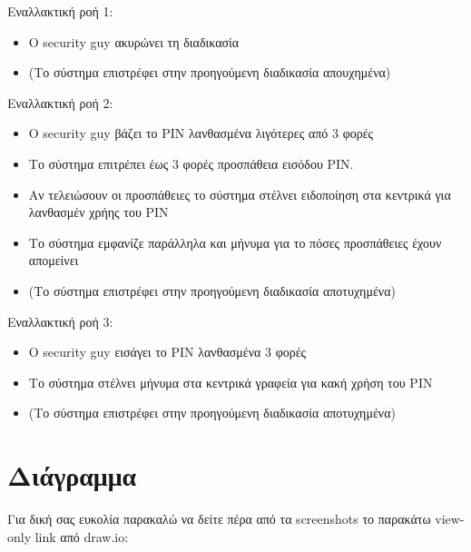 \documentclass{article}
\begin{document}
\noindent Εναλλακτική ροή 1:
\begin{itemize}
    \item Ο security guy ακυρώνει τη διαδικασία
    \item (Το σύστημα επιστρέφει στην προηγούμενη διαδικασία απουχημένα)
\end{itemize}

\noindent Εναλλακτική ροή 2:
\begin{itemize}
    \item Ο security guy βάζει το PIN λανθασμένα λιγότερες από 3 φορές
    \item Το σύστημα επιτρέπει έως 3 φορές προσπάθεια εισόδου PIN.
    \item Αν τελειώσουν οι προσπάθειες το σύστημα στέλνει ειδοποίηση στα κεντρικά για λανθασμέν χρήης του PIN
    \item Το σύστημα εμφανίζε παράλληλα και μήνυμα για το πόσες προσπάθειες έχουν απομείνει
    \item (Το σύστημα επιστρέφει στην προηγούμενη διαδικασία αποτυχημένα)
\end{itemize}

\noindent Εναλλακτική ροή 3:
\begin{itemize}
    \item Ο security guy εισάγει το PIN λανθασμένα 3 φορές
    \item Το σύστημα στέλνει μήνυμα στα κεντρικά γραφεία για κακή χρήση του PIN
    \item (Το σύστημα επιστρέφει στην προηγούμενη διαδικασία αποτυχημένα)
\end{itemize}

\section{Διάγραμμα}

Για δική σας ευκολία παρακαλώ να δείτε πέρα από τα screenshots το παρακάτω view-only link από draw.io:
\end{document}
